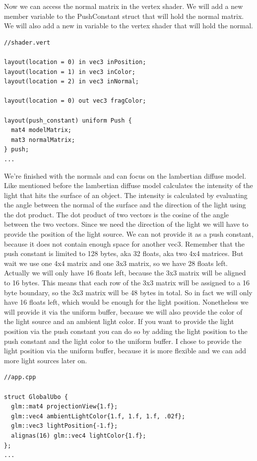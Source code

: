 \documentclass[12pt]{report} \usepackage{preamble}
\begin{document}
Now we can access the normal matrix in the vertex shader. We will add a new member variable to the PushConstant struct that will hold the normal matrix.
We will also add a new in variable to the vertex shader that will hold the normal.

\begin{lstlisting}[Language=C++]
//shader.vert

layout(location = 0) in vec3 inPosition;
layout(location = 1) in vec3 inColor;
layout(location = 2) in vec3 inNormal;

layout(location = 0) out vec3 fragColor;

layout(push_constant) uniform Push {
  mat4 modelMatrix;
  mat3 normalMatrix;
} push;
...
\end{lstlisting}

We're finished with the normals and can focus on the lambertian diffuse model.
Like mentioned before the lambertian diffuse model calculates the intensity of the light that hits the surface of an object.
The intensity is calculated by evaluating the angle between the normal of the surface and the direction of the light using the dot product.
The dot product of two vectors is the cosine of the angle between the two vectors.
Since we need the direction of the light we will have to provide the position of the light source.
We can not provide it as a push constant, because it does not contain enough space for another vec3.
Remember that the push constant is limited to 128 bytes, aka 32 floats, aka two 4x4 matrices.
But wait we use one 4x4 matrix and one 3x3 matrix, so we have 28 floats left.
Actually we will only have 16 floats left, because the 3x3 matrix will be aligned to 16 bytes.
This means that each row of the 3x3 matrix will be assigned to a 16 byte boundary, so the 3x3 matrix will be 48 bytes in total.
So in fact we will only have 16 floats left, which would be enough for the light position.
Nonetheless we will provide it via the uniform buffer, because we will also provide the color of the light source and an ambient light color.
If you want to provide the light position via the push constant you can do so by adding the light position to the push constant and the light color to the uniform buffer.
I chose to provide the light position via the uniform buffer, because it is more flexible and we can add more light sources later on.

\begin{lstlisting}[Language=C++]
//app.cpp

struct GlobalUbo {
  glm::mat4 projectionView{1.f};
  glm::vec4 ambientLightColor{1.f, 1.f, 1.f, .02f};
  glm::vec3 lightPosition{-1.f};
  alignas(16) glm::vec4 lightColor{1.f};
};
...
\end{lstlisting}
\end{document}
